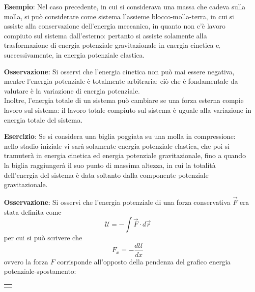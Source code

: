 \documentclass[a4paper]{extarticle}
\begin{document}
\vspace{1em}
\noindent
\textbf{Esempio}: Nel caso precedente, in cui si considerava una massa che cadeva sulla molla, si può considerare come sistema l'assieme blocco-molla-terra, in cui si assiste alla conservazione dell'energia meccanica, in quanto non c'è lavoro compiuto sul sistema dall'esterno: pertanto si assiste solamente alla trasformazione di energia potenziale gravitazionale in energia cinetica e, successivamente, in energia potenziale elastica.

\vspace{1em}
\noindent
\textbf{Osservazione}: Si osservi che l'energia cinetica non può mai essere negativa, mentre l'energia potenziale è totalmente arbitraria: ciò che è fondamentale da valutare è la variazione di energia potenziale.\\
Inoltre, l'energia totale di un sistema può cambiare se una forza esterna compie lavoro sul sistema: il lavoro totale compiuto sul sistema è uguale alla variazione in energia totale del sistema.

\vspace{1em}
\noindent
\textbf{Esercizio}: Se si considera una biglia poggiata su una molla in compressione: nello stadio iniziale vi sarà solamente energia potenziale elastica, che poi si tramuterà in energia cinetica ed energia potenziale gravitazionale, fino a quando la biglia raggiungerà il suo punto di massima altezza, in cui la totalità dell'energia del sistema è data soltanto dalla componente potenziale gravitazionale.

\vspace{1em}
\noindent
\textbf{Osservazione}: Si osservi che l'energia potenziale di una forza conservativa $\vec F$ era stata definita come
\[\mathcal{U} = - \int \vec F \cdot d \vec r\]
per cui si può scrivere che
\[\boxed{F_x = - \frac{d \mathcal{U}}{dx}}\]
ovvero la forza $F$ corrisponde all'opposto della pendenza del grafico energia potenziale-spostamento:

\vspace{2em}
\noindent
{}
\begin{tabularx}{\textwidth}{P}
  {
      \centering
  }
\end{tabularx}
\end{document}
